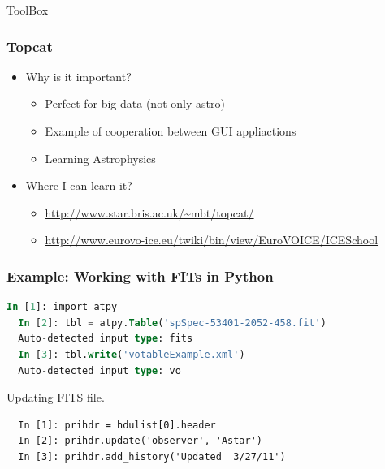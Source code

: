 \documentclass[fleqn]{beamer}
\begin{document}
\begin{section}{ToolBox}
\begin{frame}
\begin{itemize}
\begin{itemize}
      \end{itemize}
  \end{itemize}
  \end{frame}


  \begin{frame}\frametitle{Topcat}
  \begin{itemize}
    \item{Why is it important?}
      \begin{itemize}
      \item Perfect for big data (not only astro) 
      \item Example of cooperation between GUI appliactions
      \item Learning Astrophysics

      \end{itemize}
    \item{Where I can learn it?}
      \begin{itemize}
      \item \url{http://www.star.bris.ac.uk/~mbt/topcat/}
      \item \url{http://www.eurovo-ice.eu/twiki/bin/view/EuroVOICE/ICESchool}

      \end{itemize}
  \end{itemize}
  \end{frame}




\begin{frame}[containsverbatim]\frametitle{Example: Working with FITs
    in Python}
\begin{lstlisting}[language=SQL]
  In [1]: import atpy
  In [2]: tbl = atpy.Table('spSpec-53401-2052-458.fit')
  Auto-detected input type: fits
  In [3]: tbl.write('votableExample.xml')
  Auto-detected input type: vo
\end{lstlisting}
Updating FITS file.

\begin{lstlisting}
  In [1]: prihdr = hdulist[0].header
  In [2]: prihdr.update('observer', 'Astar')
  In [3]: prihdr.add_history('Updated  3/27/11')
\end{lstlisting}

\end{frame}




\end{section}
\end{document}
